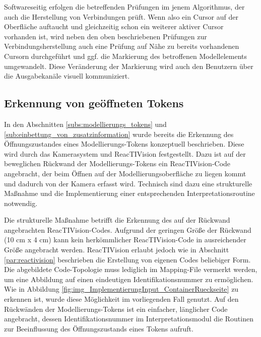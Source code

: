 Softwareseitig erfolgen die betreffenden Prüfungen im jenem Algorithmus, der auch die Herstellung von Verbindungen prüft. Wenn also ein Cursor auf der Oberfläche auftaucht und gleichzeitig schon ein weiterer aktiver Cursor vorhanden ist, wird neben den oben beschriebenen Prüfungen zur Verbindungsherstellung auch eine Prüfung auf Nähe zu bereits vorhandenen Cursorn durchgeführt und ggf. die Markierung des betroffenen Modellelements umgewandelt. Diese Veränderung der Markierung wird auch den Benutzern über die Ausgabekanäle visuell kommuniziert.


\subsection{Erkennung von geöffneten Tokens} %
\label{sub:erkennung_von_geöffneten_tokens}

In den Abschnitten \ref{subs:modellierungs_tokens} und \ref{sub:einbettung_von_zusatzinformation} wurde bereits die Erkennung des Öffnungszustandes eines Modellierungs-Tokens konzeptuell beschrieben. Diese wird durch das Kamerasystem und ReacTIVision festgestellt. Dazu ist auf der beweglichen Rückwand der Modellierungs-Tokens ein ReacTIVision-Code angebracht, der beim Öffnen auf der Modellierungsoberfläche zu liegen kommt und dadurch von der Kamera erfasst wird. Technisch sind dazu eine strukturelle Maßnahme und die Implementierung einer entsprechenden Interpretationsroutine notwendig.

Die strukturelle Maßnahme betrifft die Erkennung des auf der Rückwand angebrachten ReacTIVision-Codes. Aufgrund der geringen Größe der Rückwand (10 cm x 4 cm) kann kein herkömmlicher ReacTIVision-Code in ausreichender Größe angebracht werden. ReacTIVision erlaubt jedoch wie in Abschnitt \ref{par:reactivision} beschrieben die Erstellung von eigenen Codes beliebiger Form. Die abgebildete Code-Topologie muss lediglich im Mapping-File vermerkt werden, um eine Abbildung auf einen eindeutigen Identifikationsnummer zu ermöglichen. Wie in Abbildung \ref{fig:img_ImplementierungInput_ContainerRueckseite} zu erkennen ist, wurde diese Möglichkeit im vorliegenden Fall genutzt. Auf den Rückwänden der Modellierungs-Tokens ist ein einfacher, länglicher Code angebracht, dessen Identifikationsnummer im Interpretationsmodul die Routinen zur Beeinflussung des Öffnungszustands eines Tokens aufruft.

